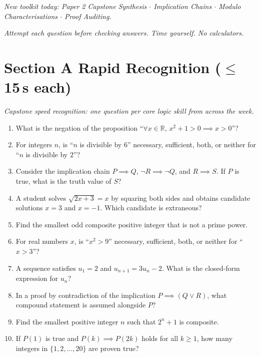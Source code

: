 \documentclass[11pt,a4paper]{article}
\begin{document}
\noindent\textit{New toolkit today: Paper 2 Capstone Synthesis $\cdot$ Implication Chains $\cdot$ Modulo Characterisations $\cdot$ Proof Auditing.}

\vspace{2pt}
\noindent\textit{Attempt each question before checking answers. Time yourself. No calculators.}

\section*{Section A \quad Rapid Recognition \hfill{\normalfont\small($\leq$15\,s each)}}

\noindent\textit{Capstone speed recognition: one question per core logic skill from across the week.}

\begin{enumerate}

\item What is the negation of the proposition ``$\forall x \in \mathbb{R},\, x^2 + 1 > 0 \implies x > 0$''?

\item For integers $n$, is ``$n$ is divisible by $6$'' necessary, sufficient, both, or neither for ``$n$ is divisible by $2$''?

\item Consider the implication chain $P \implies Q$, $\neg R \implies \neg Q$, and $R \implies S$. If $P$ is true, what is the truth value of $S$?

\item A student solves $\sqrt{2x+3} = x$ by squaring both sides and obtains candidate solutions $x=3$ and $x=-1$. Which candidate is extraneous?

\item Find the smallest odd composite positive integer that is not a prime power.

\item For real numbers $x$, is ``$x^2 > 9$'' necessary, sufficient, both, or neither for ``$x > 3$''?

\item A sequence satisfies $u_1 = 2$ and $u_{n+1} = 3u_n - 2$. What is the closed-form expression for $u_n$?

\item In a proof by contradiction of the implication $P \implies (Q \lor R)$, what compound statement is assumed alongside $P$?

\item Find the smallest positive integer $n$ such that $2^n + 1$ is composite.

\item If $P(1)$ is true and $P(k) \implies P(2k)$ holds for all $k \ge 1$, how many integers in $\{1, 2, \dots, 20\}$ are proven true?

\end{enumerate}
\end{document}
